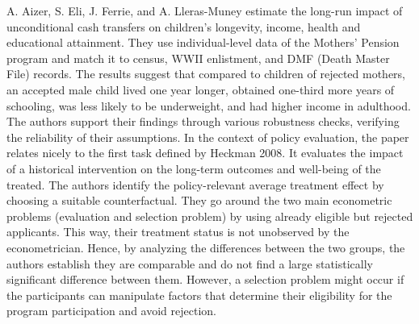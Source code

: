 A. Aizer, S. Eli, J. Ferrie, and A. Lleras-Muney estimate the long-run
impact of unconditional cash transfers on children's longevity, income,
health and educational attainment. They use individual-level data of
the Mothers' Pension program and match it to census, WWII enlistment,
and DMF (Death Master File) records. The results suggest that compared
to children of rejected mothers, an accepted male child lived one year
longer, obtained one-third more years of schooling, was less likely to
be underweight, and had higher income in adulthood. The authors support their
findings through various robustness checks, verifying the reliability
of their assumptions. In the context of policy evaluation, the paper 
relates nicely to the first task defined by Heckman 2008. It evaluates the impact of a historical intervention on the long-term outcomes and well-being of the treated. The authors identify the policy-relevant average treatment effect by choosing a suitable counterfactual. They go around the two main econometric problems (evaluation and selection problem) by using already eligible but rejected applicants. This way, their treatment status is not unobserved by the econometrician. Hence, by analyzing the differences between the two groups, the authors establish they are comparable and do not find a large statistically significant difference between them. However, a selection problem might occur if the participants can manipulate factors that determine their eligibility for the program participation and avoid rejection.
